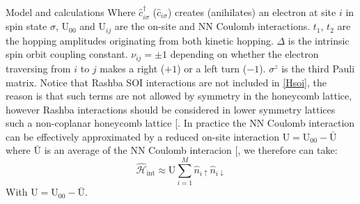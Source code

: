 \documentclass[aps,prl,twocolumn,amsmath,amssymb,superscriptaddress,nobibnotes]{revtex4-1}%
\renewcommand{\cite}[1]{{[}\onlinecite{#1}{]}}
\begin{document}
\begin{section}{Model and calculations}
Where $\hat{c}_{i \sigma}^\dagger$ ($ \hat{c}_{i \sigma}$) creates (anihilates) an electron at site $i$ in spin state $\sigma$, $\text{U}_{00}$ and $\text{U}_{ij}$ are the on-site and NN Coulomb interactions. $t_1$, $t_2$ are the hopping amplitudes originating from both kinetic hopping. $\Delta$ is the intrinsic spin orbit coupling constant. $\nu_{ij}=\pm 1$ depending on whether the electron traversing from $i$ to $j$ makes a right ($+1$) or a left turn ($-1$). $\sigma^{z}$ is the third Pauli matrix. Notice that Rashba SOI interactions are not included in \ref{Hsoi}, the reason is that such terms are not allowed by symmetry in the honeycomb lattice, however Rashba interactions should be considered in lower symmetry lattices such a non-coplanar honeycomb lattice \cite{Liu2011}.
In practice the NN Coulomb interaction can be effectively approximated by a reduced on-site interaction $\text{U} = \text{U}_{00} - \bar{\text{U}}$ where $\bar{\text{U}}$ is an average of the NN Coulomb interacion \cite{Schuler2013}, we therefore can take:
\begin{equation}
\hat{\mathcal{H}}_{\text{int}} \approx \text{U}\sum_{i=1}^M \hat{n}_{i\uparrow}\hat{n}_{i\downarrow}
\end{equation}
With $\text{U} = \text{U}_{00} - \bar{\text{U}}$.


\end{section}
\end{document}
